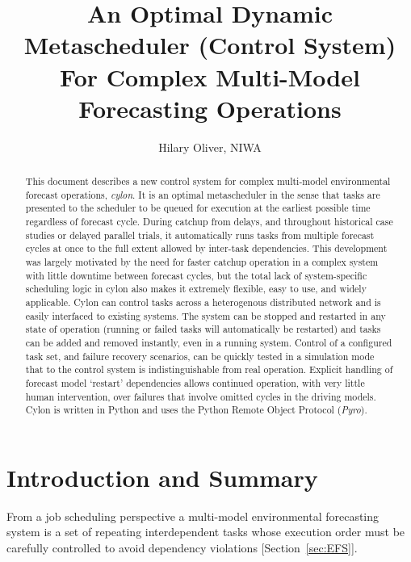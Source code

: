 \documentclass[11pt,a4paper]{article}
\title{An Optimal Dynamic Metascheduler (Control System) For Complex Multi-Model Forecasting Operations}
\author{Hilary Oliver, NIWA}
\begin{document}
\maketitle

\pagebreak
\tableofcontents
\pagebreak

\begin{abstract}

This document describes a new control system for complex multi-model
environmental forecast operations, {\em cylon}. It is an optimal
metascheduler in the sense that tasks are presented to the scheduler to
be queued for execution at the earliest possible time regardless of
forecast cycle. During catchup from delays, and throughout historical
case studies or delayed parallel trials, it automatically runs tasks
from multiple forecast cycles at once to the full extent allowed by
inter-task dependencies. This development was largely motivated by the
need for faster catchup operation in a complex system with little
downtime between forecast cycles, but the total lack of system-specific
scheduling logic in cylon also makes it extremely flexible, easy to
use, and widely applicable.  Cylon can control tasks across a
heterogenous distributed network and is easily interfaced to existing
systems. The system can be stopped and restarted in any state of
operation (running or failed tasks will automatically be restarted) and
tasks can be added and removed instantly, even in a running system.
Control of a configured task set, and failure recovery scenarios, can be
quickly tested in a simulation mode that to the control system is
indistinguishable from real operation.  Explicit handling of forecast
model `restart' dependencies allows continued operation, with very
little human intervention, over failures that involve omitted cycles in
the driving models. Cylon is written in Python and uses the Python
Remote Object Protocol ({\em Pyro}).  

\end{abstract}


\section{Introduction and Summary}

From a job scheduling perspective a multi-model environmental
forecasting system is a set of repeating interdependent tasks whose
execution order must be carefully controlled to avoid dependency
violations [Section~\ref{sec:EFS}]. 
\end{document}
